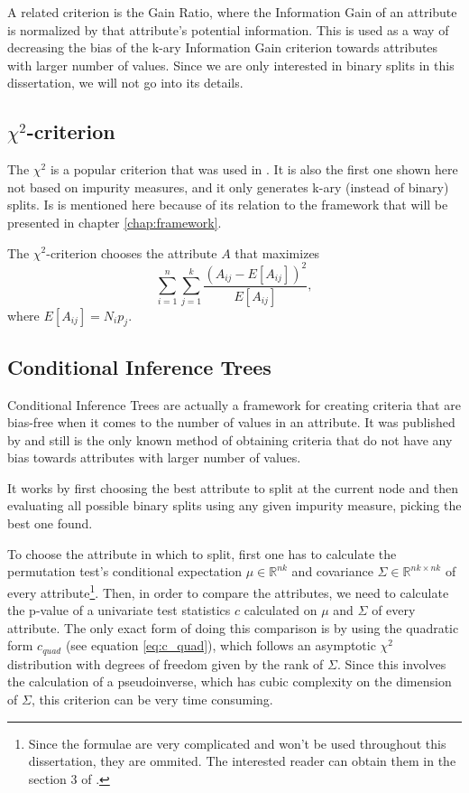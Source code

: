 A related criterion is the Gain Ratio, where the Information Gain of an attribute is normalized by that attribute's potential information. This is used as a way of decreasing the bias of the k-ary Information Gain criterion towards attributes with larger number of values. Since we are only interested in binary splits in this dissertation, we will not go into its details.


\subsection{$\chi^2$-criterion}
The $\chi^2$ is a popular criterion that was  used in \cite{Mingers.87}. It is also the first one shown here not based on impurity measures, and it only generates k-ary (instead of binary) splits. Is is mentioned here because of its relation to the framework that will be presented in chapter \ref{chap:framework}.

The $\chi^2$-criterion chooses the attribute $A$ that maximizes
\begin{equation}
\label{eq:chitest}
\sum_{i=1}^n \sum_{j=1}^k \frac{(A_{ij}-E[A_{ij}] )^2}{E[A_{ij}]},
\end{equation}
where $E[A_{ij}]=N_i p_j$.

\subsection{Conditional Inference Trees}
Conditional Inference Trees are actually a framework for creating criteria that are bias-free when it comes to the number of values in an attribute. It was published by \cite{Hothorn:2006:URP} and still is the only known method of obtaining criteria that do not have any bias towards attributes with larger number of values.

It works by first choosing the best attribute to split at the current node and then evaluating all possible binary splits using any given impurity measure, picking the best one found.

To choose the attribute in which to split, first one has to calculate the permutation test's conditional expectation $\mu \in \mathbb{R}^{nk}$ and covariance $\Sigma \in \mathbb{R}^{nk\times nk}$ of every attribute\footnote{Since the formulae are very complicated and won't be used throughout this dissertation, they are ommited. The interested reader can obtain them in the section 3 of  \cite{Hothorn:2006:URP}.}. Then, in order to compare the attributes, we need to calculate the p-value of a univariate test statistics $c$ calculated on $\mu$ and $\Sigma$ of every attribute. The only exact form of doing this comparison is by using the quadratic form $c_{quad}$ (see equation \ref{eq:c_quad}), which follows an asymptotic $\chi^2$ distribution with degrees of freedom given by the rank of $\Sigma$. Since this involves the calculation of a pseudoinverse, which has cubic complexity on the dimension of $\Sigma$, this criterion can be very time consuming.

